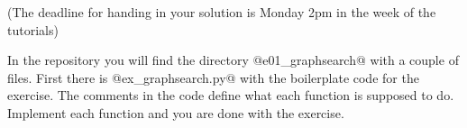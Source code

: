 

\renewcommand{\course}{Artificial Intelligence}
\renewcommand{\coursepicture}{course_ai}
\renewcommand{\coursedate}{Winter 2019}
\renewcommand{\exnum}{1}

\exercises










(The deadline for handing in your solution is Monday 2pm in the week of the tutorials)

In the repository you will find the directory @e01_graphsearch@ with a
couple of files. First there is @ex_graphsearch.py@ with the
boilerplate code for the exercise. The comments in the code define
what each function is supposed to do. Implement each function and you
are done with the exercise.

